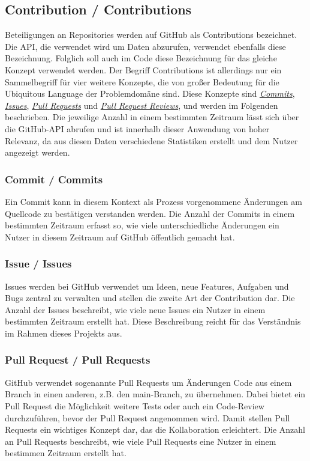 \subsection*{Contribution / Contributions}
\label{sec:Contributions}
Beteiligungen an Repositories werden auf GitHub als Contributions bezeichnet. 
Die API, die verwendet wird um Daten abzurufen, verwendet ebenfalls diese Bezeichnung. 
Folglich soll auch im Code diese Bezeichnung für das gleiche Konzept verwendet werden.
\newline
Der Begriff Contributions ist allerdings nur ein Sammelbegriff für vier weitere Konzepte, die von großer Bedeutung für die Ubiquitous Language der Problemdomäne sind.
Diese Konzepte sind \hyperref[sec:Commits]{\textit{Commits}}, \hyperref[sec:Issues]{\textit{Issues}}, \hyperref[sec:PullRequests]{\textit{Pull Requests}} und \hyperref[sec:PullRequestReviews]{\textit{Pull Request Reviews}}, und werden im Folgenden beschrieben.
Die jeweilige Anzahl in einem bestimmten Zeitraum lässt sich über die GitHub-API abrufen und ist innerhalb dieser Anwendung von hoher Relevanz, da aus diesen Daten verschiedene Statistiken erstellt und dem Nutzer angezeigt werden.
\subsubsection*{Commit / Commits}
\label{sec:Commits}
Ein Commit kann in diesem Kontext als Prozess vorgenommene Änderungen am Quellcode zu bestätigen verstanden werden.
Die Anzahl der Commits in einem bestimmten Zeitraum erfasst so, wie viele unterschiedliche Änderungen ein Nutzer in diesem Zeitraum auf GitHub öffentlich gemacht hat. 
\subsubsection*{Issue / Issues}
\label{sec:Issues}
Issues werden bei GitHub verwendet um Ideen, neue Features, Aufgaben und Bugs zentral zu verwalten und stellen die zweite Art der Contribution dar.
Die Anzahl der Issues beschreibt, wie viele neue Issues ein Nutzer in einem bestimmten Zeitraum erstellt hat.
Diese Beschreibung reicht für das Verständnis im Rahmen dieses Projekts aus.
\subsubsection*{Pull Request / Pull Requests}
\label{sec:PullRequests}
GitHub verwendet sogenannte Pull Requests um Änderungen Code aus einem Branch in einen anderen, z.B. den main-Branch, zu übernehmen.
Dabei bietet ein Pull Request die Möglichkeit weitere Tests oder auch ein Code-Review durchzuführen, bevor der Pull Request angenommen wird.
Damit stellen Pull Requests ein wichtiges Konzept dar, das die Kollaboration erleichtert.
Die Anzahl an Pull Requests beschreibt, wie viele Pull Requests eine Nutzer in einem bestimmen Zeitraum erstellt hat.
